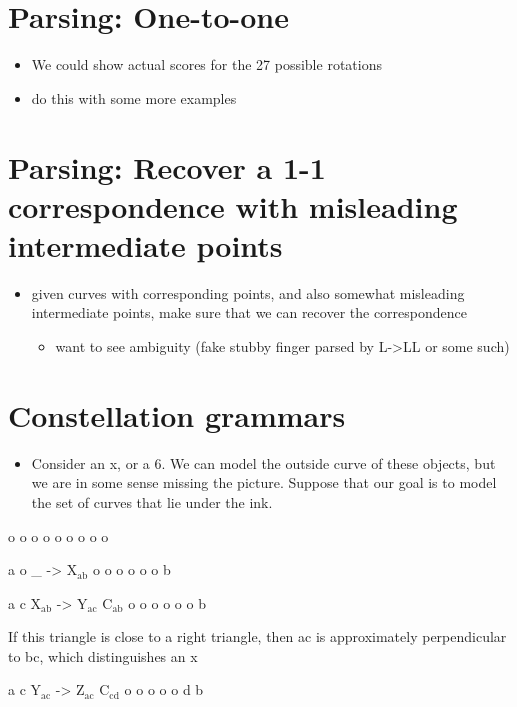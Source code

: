 \documentclass{book}
\begin{document}
\section{Parsing: One-to-one}
\label{sec-6_14}

\begin{itemize}
\item We could show actual scores for the 27 possible rotations
\item do this with some more examples
\end{itemize}
\section{Parsing: Recover a 1-1 correspondence with misleading intermediate points}
\label{sec-6_15}


\begin{itemize}
\item given curves with corresponding points, and also somewhat
    misleading intermediate points, make sure that we can recover the
    correspondence

\begin{itemize}
\item want to see ambiguity (fake stubby finger parsed by L->LL or some such)
\end{itemize}

\end{itemize}
\section{Constellation grammars}
\label{sec-6_16}

\begin{itemize}
\item Consider an x, or a 6. We can model the outside curve of these
    objects, but we are in some sense missing the picture. Suppose
    that our goal is to model the set of curves that lie under the
    ink.
\end{itemize}

o   o
 o o
  o
 o o
o   o

a   o  \_{} -> X$_{\mathrm{ab}}$
 o o
  o
 o o
o   b

a   c  X$_{\mathrm{ab}}$ -> Y$_{\mathrm{ac}}$ C$_{\mathrm{ab}}$
 o o
  o
 o o
o   b

If this triangle is close to a right triangle, then ac is
approximately perpendicular to bc, which distinguishes an x

a   c  Y$_{\mathrm{ac}}$ -> Z$_{\mathrm{ac}}$ C$_{\mathrm{cd}}$
 o o
  o
 o o
d   b
\end{document}
